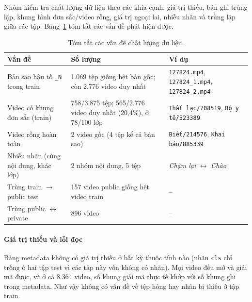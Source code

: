 Nhóm kiểm tra chất lượng dữ liệu theo các khía cạnh: giá trị thiếu, bản ghi trùng lặp, khung hình đơn sắc/video rỗng, giá trị ngoại lai, nhiễu nhãn và trùng lặp giữa các tập. Bảng~\ref{tab:eda_quality} tóm tắt các vấn đề phát hiện được.

\begin{table}[H]
  \centering
  \caption{Tóm tắt các vấn đề chất lượng dữ liệu.}
  \label{tab:eda_quality}
  \small
  \begin{tabular}{@{}p{}p{}p{}@{}}
    \toprule
    \textbf{Vấn đề} & \textbf{Số lượng} & \textbf{Ví dụ} \\
    \midrule
    Bản sao hậu tố \texttt{\_N} trong train & 1.069 tệp giống hệt bản gốc; còn 2.776 video duy nhất & \texttt{127824.mp4}, \texttt{127824\_1.mp4}, \texttt{127824\_2.mp4} \\
    Video có khung đơn sắc (train) & 758/3.875 tệp; 565/2.776 video duy nhất (20,4\%), ở 78/100 lớp & \texttt{Thất lạc/708519}, \texttt{Bộ y tế/523389} \\
    Video rỗng hoàn toàn & 2 video gốc (4 tệp kể cả bản sao) & \texttt{Biết/214576}, \texttt{Khai báo/885339} \\
    Nhiễu nhãn (cùng nội dung, khác lớp) & 2 nhóm nội dung, 5 tệp & \textit{Chậm lại} $\leftrightarrow$ \textit{Chào} \\
    Trùng train $\rightarrow$ public test & 157 video public giống hệt video train & -- \\
    Trùng public $\leftrightarrow$ private & 896 video & -- \\
    \bottomrule
  \end{tabular}
\end{table}

\paragraph{Giá trị thiếu và lỗi đọc} Bảng metadata không có giá trị thiếu ở bất kỳ thuộc tính nào (nhãn \texttt{cls} chỉ trống ở hai tập test vì các tập này vốn không có nhãn). Mọi video đều mở và giải mã được, và ở cả 8.364 video, số khung giải mã thực tế khớp với số khung ghi trong metadata. Như vậy không có vấn đề về tệp hỏng hay nhãn bị thiếu ở tập train.

